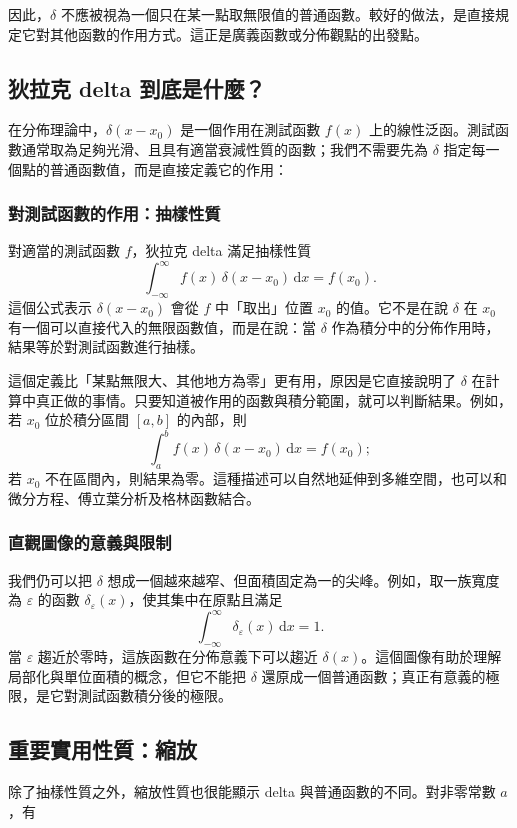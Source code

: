 \documentclass[10pt,a4paper,fontset=none]{ctexart}
\newcommand{\diff}{\,\mathrm{d}}
\begin{document}
因此，$\delta$ 不應被視為一個只在某一點取無限值的普通函數。較好的做法，是直接規定它對其他函數的作用方式。這正是廣義函數或分佈觀點的出發點。

\subsection{狄拉克 delta 到底是什麼？}
在分佈理論中，$\delta(x-x_0)$ 是一個作用在測試函數 $f(x)$ 上的線性泛函。測試函數通常取為足夠光滑、且具有適當衰減性質的函數；我們不需要先為 $\delta$ 指定每一個點的普通函數值，而是直接定義它的作用：

\subsubsection{對測試函數的作用：抽樣性質}
對適當的測試函數 $f$，狄拉克 delta 滿足抽樣性質
\begin{equation}
  \int_{-\infty}^{\infty} f(x)\,\delta(x-x_0)\diff{x}
  = f(x_0).
\end{equation}
這個公式表示 $\delta(x-x_0)$ 會從 $f$ 中「取出」位置 $x_0$ 的值。它不是在說 $\delta$ 在 $x_0$ 有一個可以直接代入的無限函數值，而是在說：當 $\delta$ 作為積分中的分佈作用時，結果等於對測試函數進行抽樣。

這個定義比「某點無限大、其他地方為零」更有用，原因是它直接說明了 $\delta$ 在計算中真正做的事情。只要知道被作用的函數與積分範圍，就可以判斷結果。例如，若 $x_0$ 位於積分區間 $[a,b]$ 的內部，則
\begin{equation}
  \int_a^b f(x)\,\delta(x-x_0)\diff{x}=f(x_0);
\end{equation}
若 $x_0$ 不在區間內，則結果為零。這種描述可以自然地延伸到多維空間，也可以和微分方程、傅立葉分析及格林函數結合。

\subsubsection{直觀圖像的意義與限制}
我們仍可以把 $\delta$ 想成一個越來越窄、但面積固定為一的尖峰。例如，取一族寬度為 $\varepsilon$ 的函數 $\delta_\varepsilon(x)$，使其集中在原點且滿足
\begin{equation}
  \int_{-\infty}^{\infty}\delta_\varepsilon(x)\diff{x}=1.
\end{equation}
當 $\varepsilon$ 趨近於零時，這族函數在分佈意義下可以趨近 $\delta(x)$。這個圖像有助於理解局部化與單位面積的概念，但它不能把 $\delta$ 還原成一個普通函數；真正有意義的極限，是它對測試函數積分後的極限。

\subsection{重要實用性質：縮放}
除了抽樣性質之外，縮放性質也很能顯示 delta 與普通函數的不同。對非零常數 $a$，有
\end{document}
